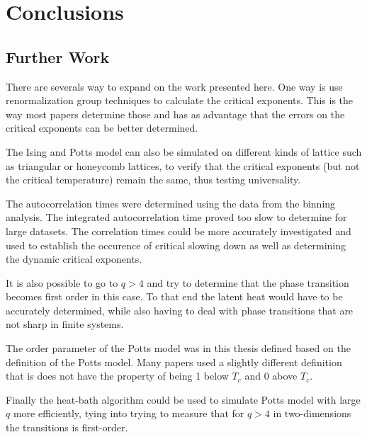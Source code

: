 \documentclass[11pt, a4paper]{report} %
\begin{document}
\chapter{Conclusions}

\section{Further Work}
There are severals way to expand on the work presented here.
One way is use renormalization group techniques to calculate the critical exponents.
This is the way most papers determine those and has as advantage that the errors on the critical exponents can be better determined.

The Ising and Potts model can also be simulated on different kinds of lattice such as triangular or honeycomb lattices, to verify that the critical exponents (but not the critical temperature) remain the same, thus testing universality.

The autocorrelation times were determined using the data from the binning analysis.
The integrated autocorrelation time proved too slow to determine for large datasets.
The correlation times could be more accurately investigated and used to establish the occurence of critical slowing down as well as determining the dynamic critical exponents.

It is also possible to go to \(q > 4\) and try to determine that the phase transition becomes first order in this case.
To that end the latent heat would have to be accurately determined, while also having to deal with phase transitions that are not sharp in finite systems.

The order parameter of the Potts model was in this thesis defined based on the definition of the Potts model.
Many papers used a slightly different definition that is does not have the property of being 1 below \(T_c\) and 0 above \(T_c\).\cite{binder:1981a,wu:1982,fan:2007}

Finally the heat-bath algorithm could be used to simulate Potts model with large \(q\) more efficiently\cite{newman:1999}, tying into trying to measure that for \(q > 4\) in two-dimensions the transitions is first-order.



\end{document}
